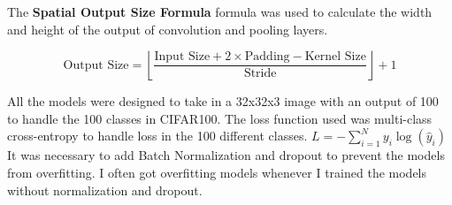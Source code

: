 \documentclass[conference]{IEEEtran}
\begin{document}


The \textbf{Spatial Output Size Formula} formula was used to calculate the width and height of the output of convolution and pooling layers.

$$  \text{Output Size} = \left\lfloor \frac{\text{Input Size} + 2 \times \text{Padding} - \text{Kernel Size}}{\text{Stride}} \right\rfloor + 1  $$

All the models were designed to take in a 32x32x3 image with an output of 100 to handle the 100 classes in CIFAR100.  %
The loss function used was multi-class cross-entropy to handle loss in the 100 different classes. $L = -\sum_{i=1}^{N} y_i \log(\hat{y}_i)$
It was necessary to add Batch Normalization and dropout to prevent the models from overfitting. I often got overfitting models whenever I trained the models without normalization and dropout.
\end{document}

